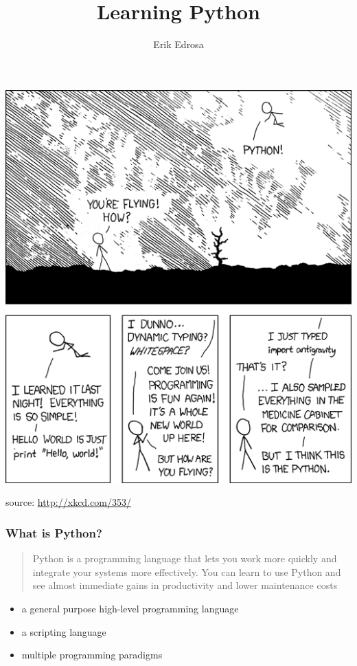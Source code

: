\documentclass{beamer}
\title{Learning Python}
\author{Erik Edrosa}
\institute [PLUG]{Panther Linux User Group}
\date{} %
\begin{document}
\frame{\maketitle}
\begin{frame}
  \centerline{\includegraphics[keepaspectration=true, width=0.5 \textwidth]{python}}
  \centerline{source: \url{http://xkcd.com/353/}}
\end{frame}
\begin{frame}
  \frametitle{What is Python?}
  \begin{quote}
    Python is a programming language that lets you work more quickly and integrate your systems more effectively. You can learn to use Python and see almost immediate gains in productivity and lower maintenance costs
  \end{quote}
  \begin{itemize}
    \item a general purpose high-level programming language
    \item a scripting language
    \item multiple programming paradigms
  \end{itemize}
\end{frame}
\end{document}
